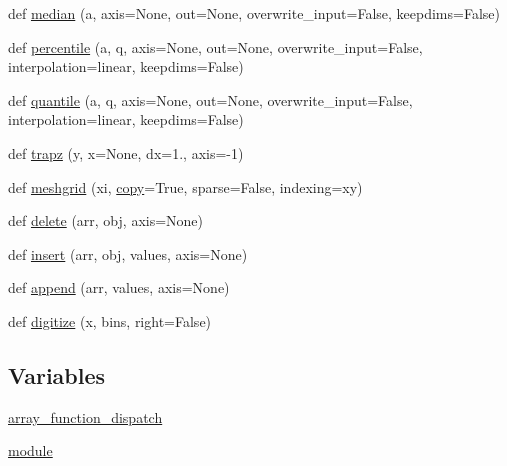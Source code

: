 \begin{DoxyCompactItemize}
\item 
def \hyperlink{namespacenumpy_1_1lib_1_1function__base_a30af8c70291ee5c8dfc1073a16c2700c}{median} (a, axis=None, out=None, overwrite\+\_\+input=False, keepdims=False)
\item 
def \hyperlink{namespacenumpy_1_1lib_1_1function__base_a083d9311a05ef68c201c1b4d8e30825d}{percentile} (a, q, axis=None, out=None, overwrite\+\_\+input=False, interpolation=\textquotesingle{}linear\textquotesingle{}, keepdims=False)
\item 
def \hyperlink{namespacenumpy_1_1lib_1_1function__base_a3e3baa0ec9b8a23019451193a4e3c401}{quantile} (a, q, axis=None, out=None, overwrite\+\_\+input=False, interpolation=\textquotesingle{}linear\textquotesingle{}, keepdims=False)
\item 
def \hyperlink{namespacenumpy_1_1lib_1_1function__base_a2145040637bbaa1ee8665d5b12df916b}{trapz} (y, x=None, dx=1., axis=-\/1)
\item 
def \hyperlink{namespacenumpy_1_1lib_1_1function__base_adc928993b52eacb44250ab13da5b65f1}{meshgrid} (xi, \hyperlink{namespacenumpy_1_1lib_1_1function__base_aa46553d3b1207934de95320186e6d9f5}{copy}=True, sparse=False, indexing=\textquotesingle{}xy\textquotesingle{})
\item 
def \hyperlink{namespacenumpy_1_1lib_1_1function__base_a2218207bd0ba2467c0e3a11575940b15}{delete} (arr, obj, axis=None)
\item 
def \hyperlink{namespacenumpy_1_1lib_1_1function__base_a5d95f04522ad4eeebdfae9f85c1cd9df}{insert} (arr, obj, values, axis=None)
\item 
def \hyperlink{namespacenumpy_1_1lib_1_1function__base_a3d2c28a02f8e243ec2d9ed603c93333f}{append} (arr, values, axis=None)
\item 
def \hyperlink{namespacenumpy_1_1lib_1_1function__base_a42ace3c0bb0f69814003a81368507982}{digitize} (x, bins, right=False)
\end{DoxyCompactItemize}
\subsection*{Variables}
\begin{DoxyCompactItemize}
\item 
\hyperlink{namespacenumpy_1_1lib_1_1function__base_ad03f4b858ee9cb78b9adf3cbb4465b1d}{array\+\_\+function\+\_\+dispatch}
\item 
\hyperlink{namespacenumpy_1_1lib_1_1function__base_a91b9bda674a46a789d9bf6ba669494d1}{module}
\end{DoxyCompactItemize}


